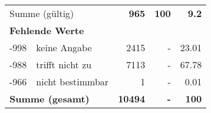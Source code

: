 \begin{longtable}{lXrrr}
     \midrule
     \multicolumn{2}{l}{Summe (gültig)} &
       \textbf{\num{965}} &
     \textbf{\num{100}} &
       \textbf{\num[round-mode=places,round-precision=2]{9.2}} \\
     \multicolumn{5}{l}{\textbf{Fehlende Werte}}\\
       -998 &
       keine Angabe &
         \num{2415} &
        - &
         \num[round-mode=places,round-precision=2]{23.01} \\
       -988 &
       trifft nicht zu &
         \num{7113} &
        - &
         \num[round-mode=places,round-precision=2]{67.78} \\
       -966 &
       nicht bestimmbar &
         \num{1} &
        - &
         \num[round-mode=places,round-precision=2]{0.01} \\
     \midrule
     \multicolumn{2}{l}{\textbf{Summe (gesamt)}} &
          \textbf{\num{10494}} &
        \textbf{-} &
        \textbf{\num{100}} \\
     \bottomrule
     \end{longtable}
     
